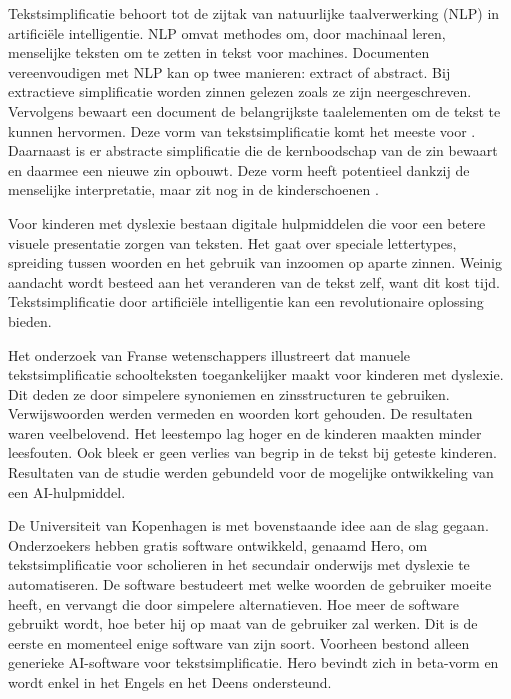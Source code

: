 Tekstsimplificatie behoort tot de zijtak van natuurlijke taalverwerking (NLP) in artificiële intelligentie. NLP omvat methodes om, door machinaal leren, menselijke teksten om te zetten in tekst voor machines. Documenten vereenvoudigen met NLP kan op twee manieren: extract of abstract. Bij extractieve simplificatie worden zinnen gelezen zoals ze zijn neergeschreven. Vervolgens bewaart een document de belangrijkste taalelementen om de tekst te kunnen hervormen. Deze vorm van tekstsimplificatie komt het meeste voor \autocite{Sciforce2020}. Daarnaast is er abstracte simplificatie die de kernboodschap van de zin bewaart en daarmee een nieuwe zin opbouwt. Deze vorm heeft potentieel dankzij de menselijke interpretatie, maar zit nog in de kinderschoenen \autocite{Chowdhary2020}.

Voor kinderen met dyslexie bestaan digitale hulpmiddelen die voor een betere visuele presentatie zorgen van teksten. Het gaat over speciale lettertypes, spreiding tussen woorden en het gebruik van inzoomen op aparte zinnen. Weinig aandacht wordt besteed aan het veranderen van de tekst zelf, want dit kost tijd. Tekstsimplificatie door artificiële intelligentie kan een revolutionaire oplossing bieden. 

Het onderzoek van Franse wetenschappers \textcite{Gala2016} illustreert dat manuele tekstsimplificatie schoolteksten toegankelijker maakt voor kinderen met dyslexie. Dit deden ze door simpelere synoniemen en zinsstructuren te gebruiken. Verwijswoorden werden vermeden en woorden kort gehouden. De resultaten waren veelbelovend. Het leestempo lag hoger en de kinderen maakten minder leesfouten. Ook bleek er geen verlies van begrip in de tekst bij geteste kinderen. Resultaten van de studie werden gebundeld voor de mogelijke ontwikkeling van een AI-hulpmiddel.

De Universiteit van Kopenhagen is met bovenstaande idee aan de slag gegaan. Onderzoekers \textcite{Bingel2018} hebben gratis software ontwikkeld, genaamd Hero, om tekstsimplificatie voor scholieren in het secundair onderwijs met dyslexie te automatiseren. De software bestudeert met welke woorden de gebruiker moeite heeft, en vervangt die door simpelere alternatieven. Hoe meer de software gebruikt wordt, hoe beter hij op maat van de gebruiker zal werken. Dit is de eerste en momenteel enige software van zijn soort. Voorheen bestond alleen generieke AI-software voor tekstsimplificatie. Hero bevindt zich in beta-vorm en wordt enkel in het Engels en het Deens ondersteund. 

